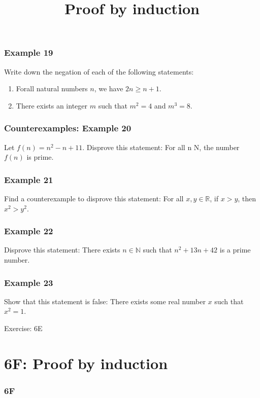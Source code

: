 \documentclass{beamer}
\begin{document}
\begin{frame}[t]
    \frametitle{Example 19}
    Write down the negation of each of the following statements:\\
    \begin{enumerate}
        \item Forall natural numbers $n$, we have $2n \geq n+1$.
        \item There exists an integer $m$ such that $m^2 = 4$ and $m^3 = 8$.
    \end{enumerate}
\end{frame}

\begin{frame}[t]
    \frametitle{Counterexamples: Example 20}
    Let $f(n) = n^2-n+11$. Disprove this statement: For all n N, the number $f(n)$ is prime.
\end{frame}

\begin{frame}[t]
    \frametitle{Example 21}
    Find a counterexample to disprove this statement: For all $x,y \in \mathbb{R}$, if $x > y$, then $x^2 > y^2$.
    
\end{frame}

\begin{frame}[t]
    \frametitle{Example 22}
    Disprove this statement: There exists $n \in \mathbb{N}$ such that $n^2 + 13n + 42$ is a prime number.
\end{frame}

\begin{frame}[t]
    \frametitle{Example 23}
    Show that this statement is false: There exists some real number $x$ such that $x^2 = 1$.
\end{frame}

\begin{frame}{Exercise: 6E}
\end{frame}

\section{6F: Proof by induction}
\begin{frame}
    \frametitle{6F}
    \begin{center}
        \title{Proof by induction}
        \maketitle
    \end{center}
\end{frame}
\end{document}
